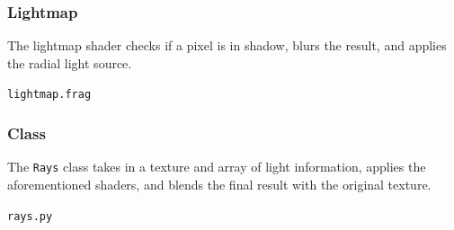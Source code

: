 \documentclass[../main/main.tex]{subfiles}
\begin{document}
\subsubsection*{Lightmap}
The lightmap shader checks if a pixel is in shadow, blurs the result, and applies the radial light source.

\noindent\verb|lightmap.frag|


\subsubsection*{Class}
The \lstinline{Rays} class takes in a texture and array of light information, applies the aforementioned shaders, and blends the final result with the original texture.

\noindent\verb|rays.py|

\end{document}
